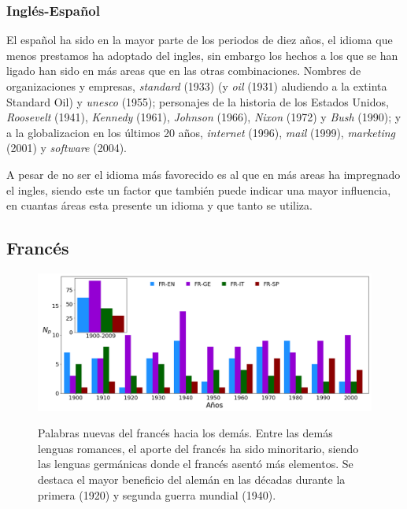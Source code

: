 \subsubsection*{Inglés-Español} %
El español ha sido en la mayor parte de los periodos de diez años,  el idioma
que menos prestamos ha adoptado del ingles, sin embargo los hechos a los que se
han ligado han sido en más areas que en las otras combinaciones.  Nombres de
organizaciones y empresas,  \textit{standard} (1933) (y \textit{oil} (1931)
aludiendo a la extinta Standard Oil) y \textit{unesco} (1955);  personajes de
la historia de los Estados Unidos,  \textit{Roosevelt} (1941), \textit{Kennedy}
(1961), \textit{Johnson} (1966),  \textit{Nixon} (1972) y \textit{Bush} (1990);
y a la globalizacion en los últimos 20 años, \textit{internet} (1996),
\textit{mail} (1999), \textit{marketing} (2001) y \textit{software} (2004).   

A pesar de no ser el idioma más favorecido es al que en más areas ha impregnado
el ingles, siendo este un factor que también puede indicar una mayor
influencia,  en cuantas áreas esta presente un idioma y que tanto se utiliza. 


\clearpage

\subsection{Francés} %

\begin{figure}[h!]
	\centering
	\includegraphics[scale=.38]{Cap_3/NC_FR.png}
	\label{fig.NC_FR}
	\caption{Palabras nuevas del francés hacia los demás. Entre las demás lenguas romances, el aporte del francés ha sido minoritario, siendo las lenguas germánicas donde el francés asentó más elementos. Se destaca el mayor beneficio del alemán en las décadas durante la primera (1920) y segunda guerra mundial (1940).}
	
	
\end{figure}

